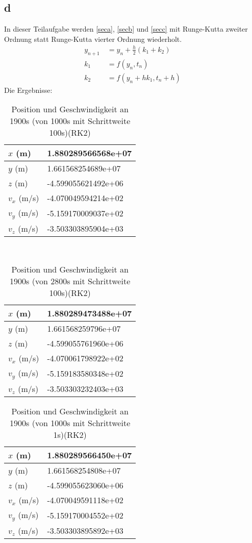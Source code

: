 \subsection{d}
In dieser Teilaufgabe werden \ref{seca}, \ref{secb} und \ref{secc} mit Runge-Kutta zweiter Ordnung statt Runge-Kutta vierter Ordnung wiederholt. 
\begin{align}
	y_{n+1} & \ = y_n + \frac{h}{2}(k_1 + k_2) \\
	k_1 & \ = f(y_n,t_n) \\
	k_2 & \ = f(y_n + hk_1, t_n + h)
\end{align}
Die Ergebnisse:
\begin{table}[htbp]\centering
	\begin{tabular}{|l|l|}
		\hline
		$x$ (m)     & 1.880289566568e+07  \\ \hline
		$y$ (m)     & 1.661568254689e+07  \\ \hline
		$z$ (m)     & -4.599055621492e+06 \\ \hline
		$v_x$ (m/s) & -4.070049594214e+02 \\ \hline
		$v_y$ (m/s) & -5.159170009037e+02 \\ \hline
		$v_z$ (m/s) & -3.503303895904e+03 \\ \hline
	\end{tabular}
	\caption{Position und Geschwindigkeit an 1900s (von 1000s mit Schrittweite 100s)(RK2)}
\end{table}\\
\begin{table}[htbp]\centering
	\begin{tabular}{|l|l|}
		\hline
		$x$ (m)     & 1.880289473488e+07  \\ \hline
		$y$ (m)     & 1.661568259796e+07  \\ \hline
		$z$ (m)     & -4.599055761960e+06 \\ \hline
		$v_x$ (m/s) & -4.070061798922e+02 \\ \hline
		$v_y$ (m/s) & -5.159183580348e+02 \\ \hline
		$v_z$ (m/s) & -3.503303232403e+03 \\ \hline
	\end{tabular}
	\caption{Position und Geschwindigkeit an 1900s (von 2800s mit Schrittweite 100s)(RK2)}
\end{table}
\clearpage
\begin{table}[htbp]\centering
	\begin{tabular}{|l|l|}
		\hline
		$x$ (m)     & 1.880289566450e+07  \\ \hline
		$y$ (m)     & 1.661568254808e+07  \\ \hline
		$z$ (m)     & -4.599055623060e+06 \\ \hline
		$v_x$ (m/s) & -4.070049591118e+02 \\ \hline
		$v_y$ (m/s) & -5.159170004552e+02 \\ \hline
		$v_z$ (m/s) & -3.503303895892e+03 \\ \hline
	\end{tabular}
	\caption{Position und Geschwindigkeit an 1900s (von 1000s mit Schrittweite 1s)(RK2)}
\end{table}